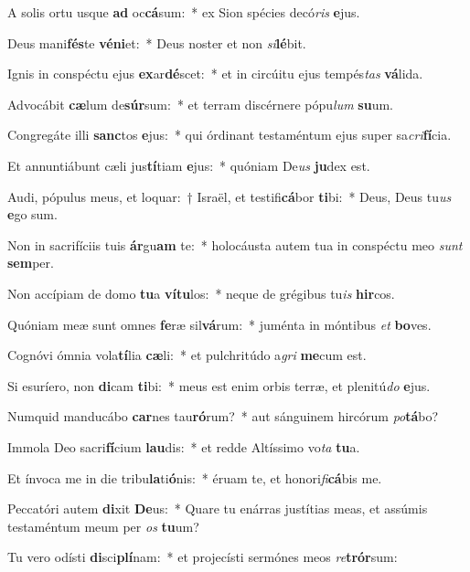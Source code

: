 \item A solis ortu usque \textbf{ad} oc\textbf{cá}sum:~* ex Sion spécies decó\textit{ris} \textbf{e}jus.
\item Deus mani\textbf{fés}te \textbf{vé}\textbf{ni}et:~* Deus noster et non \textit{si}\textbf{lé}bit.
\item Ignis in conspéctu ejus \textbf{ex}ar\textbf{dé}scet:~* et in circúitu ejus tempés\textit{tas} \textbf{vá}lida.
\item Advocábit \textbf{cæ}lum de\textbf{súr}sum:~* et terram discérnere pópu\textit{lum} \textbf{su}um.
\item Congregáte illi \textbf{sanc}tos \textbf{e}jus:~* qui órdinant testaméntum ejus super sa\textit{cri}\textbf{fí}cia.
\item Et annuntiábunt cæli jus\textbf{tí}tiam \textbf{e}jus:~* quóniam De\textit{us} \textbf{ju}dex est.
\item Audi, pópulus meus, et loquar:~† Israël, et testifi\textbf{cá}bor \textbf{ti}bi:~* Deus, Deus tu\textit{us} \textbf{e}go sum.
\item Non in sacrifíciis tuis \textbf{ár}gu\textbf{am} te:~* holocáusta autem tua in conspéctu meo \textit{sunt} \textbf{sem}per.
\item Non accípiam de domo \textbf{tu}a \textbf{ví}\textbf{tu}los:~* neque de grégibus tu\textit{is} \textbf{hir}cos.
\item Quóniam meæ sunt omnes \textbf{fe}ræ sil\textbf{vá}rum:~* juménta in móntibus \textit{et} \textbf{bo}ves.
\item Cognóvi ómnia vola\textbf{tí}lia \textbf{cæ}li:~* et pulchritúdo a\textit{gri} \textbf{me}cum est.
\item Si esuríero, non \textbf{di}cam \textbf{ti}bi:~* meus est enim orbis terræ, et plenitú\textit{do} \textbf{e}jus.
\item Numquid manducábo \textbf{car}nes tau\textbf{ró}rum?~* aut sánguinem hircórum \textit{po}\textbf{tá}bo?
\item Immola Deo sacri\textbf{fí}cium \textbf{lau}dis:~* et redde Altíssimo vo\textit{ta} \textbf{tu}a.
\item Et ínvoca me in die tribu\textbf{la}ti\textbf{ó}nis:~* éruam te, et honori\textit{fi}\textbf{cá}bis me.
\item Peccatóri autem \textbf{di}xit \textbf{De}us:~* Quare tu enárras justítias meas, et assúmis testaméntum meum per \textit{os} \textbf{tu}um?
\item Tu vero odísti \textbf{di}sci\textbf{plí}nam:~* et projecísti sermónes meos \textit{re}\textbf{trór}sum:
